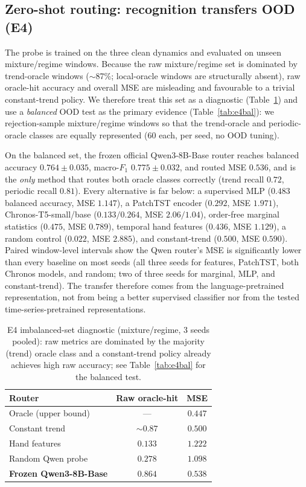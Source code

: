 \documentclass{article}
\begin{document}
\subsection{Zero-shot routing: recognition transfers OOD (E4)}
The probe is trained on the three clean dynamics and evaluated on unseen
mixture/regime windows.  Because the raw mixture/regime set is dominated by
trend-oracle windows ($\sim$87\%; local-oracle windows are structurally
absent), raw oracle-hit accuracy and overall MSE are misleading and
favourable to a trivial constant-trend policy.  We therefore treat this set as
a diagnostic (Table~\ref{tab:e4}) and use a \emph{balanced} OOD test as the
primary evidence (Table~\ref{tab:e4bal}): we rejection-sample mixture/regime
windows so that the trend-oracle and periodic-oracle classes are equally
represented (60 each, per seed, no OOD tuning).

On the balanced set, the frozen official Qwen3-8B-Base router reaches
balanced accuracy $0.764\pm0.035$, macro-$F_1$ $0.775\pm0.032$, and routed MSE
$0.536$, and is the \emph{only} method that routes both oracle classes
correctly (trend recall $0.72$, periodic recall $0.81$).  Every alternative is
far below: a supervised MLP ($0.483$ balanced accuracy, MSE $1.147$), a
PatchTST encoder ($0.292$, MSE $1.971$), Chronos-T5-small/base ($0.133/0.264$,
MSE $2.06/1.04$), order-free marginal statistics ($0.475$, MSE $0.789$),
temporal hand features ($0.436$, MSE $1.129$), a random control ($0.022$, MSE
$2.885$), and constant-trend ($0.500$, MSE $0.590$).  Paired window-level
intervals show the Qwen router's MSE is significantly lower than every
baseline on most seeds (all three seeds for features, PatchTST, both Chronos
models, and random; two of three seeds for marginal, MLP, and constant-trend).
The transfer therefore comes from the language-pretrained representation, not
from being a better supervised classifier nor from the tested
time-series-pretrained representations.

\begin{table}[t]
\centering
\small
\begin{tabular}{lcc}
\toprule
Router & Raw oracle-hit & MSE \\
\midrule
Oracle (upper bound) & --- & $0.447$ \\
Constant trend & $\sim0.87$ & $0.500$ \\
Hand features & $0.133$ & $1.222$ \\
Random Qwen probe & $0.278$ & $1.098$ \\
\textbf{Frozen Qwen3-8B-Base} & $0.864$ & $0.538$ \\
\bottomrule
\end{tabular}
\caption{E4 imbalanced-set diagnostic (mixture/regime, 3 seeds pooled): raw
metrics are dominated by the majority (trend) oracle class and a constant-trend
policy already achieves high raw accuracy; see Table~\ref{tab:e4bal} for the
balanced test.}
\label{tab:e4}
\end{table}
\end{document}
